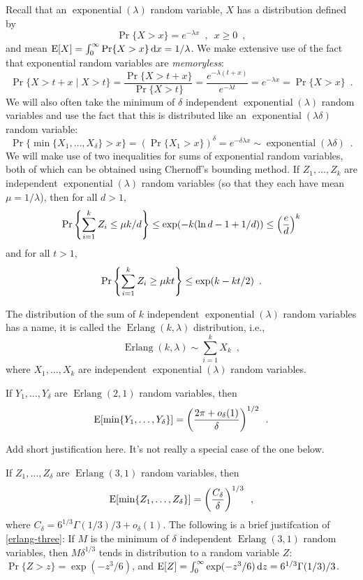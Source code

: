 \documentclass{patmorin}
\DeclareMathOperator{\exponential}{exponential}
\DeclareMathOperator{\erlang}{Erlang}
\begin{document}
Recall that an $\exponential(\lambda)$ random variable, $X$ has a
distribution defined by
\[
   \Pr\{X>x\} = e^{-\lambda x}  \enspace , \enspace x\ge 0 \enspace ,
\]
and mean $\mathrm{E}[X] = \int_0^{\infty}
\Pr\{X>x\}\,\mathrm{d}x = 1/\lambda$.  We make extensive use of the fact
that exponential random variables are \emph{memoryless}:
\[
    \Pr\{X > t+x\mid X>t\} = \frac{\Pr\{X> t+x\}}{\Pr\{X > t\}}
           = \frac{e^{-\lambda(t+x)}}{e^{-\lambda t}} = e^{-\lambda x} = \Pr\{X > x\} \enspace .
\]
We will also often take the minimum of $\delta$ independent $\exponential(\lambda)$ random variables and use the fact that this is distributed like an
$\exponential(\lambda \delta)$ random variable:
\[
   \Pr\{\min\{X_1,\ldots,X_\delta\} > x\} 
      = (\Pr\{X_1 > x\})^{\delta}
      = e^{-\delta\lambda x} \sim \exponential(\lambda \delta) \enspace .
\]
We will make use of two inequalities for sums of exponential random
variables, both of which can be obtained using Chernoff's bounding
method.  If $Z_1,\ldots,Z_k$ are independent $\exponential(\lambda)$
random variables (so that they each have mean $\mu=1/\lambda$), then
for all $d>1$,
\begin{equation}
    \Pr\left\{\sum_{i=1}^k Z_i \le \mu k/d\right\} \le \exp(-k(\ln d -1 + 1/d)) \le \left(\frac{e}{d}\right)^k  \eqlabel{head-bound}
\end{equation}
and for all $t>1$, 
\begin{equation}
    \Pr\left\{\sum_{i=1}^k Z_i \ge \mu k t\right\} \le \exp (k-kt/2) \enspace . \eqlabel{tail-bound}
\end{equation}

The distribution of the sum of $k$ independent $\exponential(\lambda)$
random variables has a name, it is called the $\erlang(k,\lambda)$
distribution, i.e.,
\[
    \erlang(k,\lambda) \sim \sum_{i=1}^k X_k \enspace ,
\]
where $X_1,\ldots,X_k$ are independent $\exponential(\lambda)$ random variables.

If $Y_1,\ldots,Y_\delta$ are $\erlang(2,1)$ random variables, then
\begin{equation}
    \E[\min\{Y_1,\ldots,Y_\delta\}] = \left(\frac{2\pi+o_\delta(1)}{\delta}\right)^{1/2}  \enspace . \eqlabel{erlang-two}
\end{equation}
\begin{todo}
Add short justification here. It's not really a special case of the one
below.
\end{todo}

If $Z_1,\ldots,Z_\delta$ are $\erlang(3,1)$ random variables, then
\begin{equation}
    \E[\min\{Z_1,\ldots,Z_\delta\}] = \left(\frac{C_\delta}{\delta}\right)^{1/3}  \eqlabel{erlang-three} \enspace ,
\end{equation}
where $C_\delta =  6^{1/3}\Gamma (1/3) / 3 + o_\delta(1)$.  The following is a brief justifcation of \eqref{erlang-three}: If $M$ is the minimum of $\delta$ independent $\erlang(3,1)$ random 
variables, then $M\delta^{1/3}$ tends in distribution to a random variable 
$Z$: $\Pr\{Z>z\} = \exp(-z^3/6)$, and $\mathrm{E}[Z]= \int_0^\infty \exp(-z^3/6)\,
\mathrm{d}z = 6^{1/3}\Gamma (1/3) / 3$. 
\end{document}
